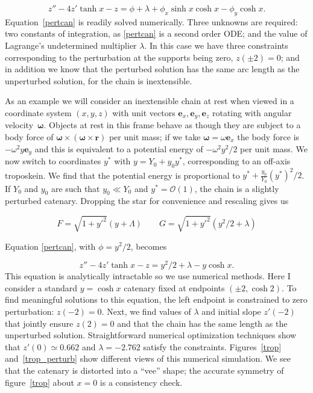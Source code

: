 \documentclass[pdflatex,sn-mathphys-num]{sn-jnl}%
\theoremstyle{thmstyleone}%
\theoremstyle{thmstyletwo}%
\theoremstyle{thmstylethree}%
\begin{document}
\begin{equation}\label{pertcan}
  z'' - 4z'\tanh x - z =
  \phi + \lambda + \phi_x\sinh x\cosh x - \phi_y\cosh x.
\end{equation}
%
Equation~\ref{pertcan} is readily solved numerically.  Three unknowns
are required: two constants of integration, as \ref{pertcan} is a
second order ODE; and the value of Lagrange's undetermined multiplier
$\lambda$.  In this case we have three constraints corresponding to
the perturbation at the supports being zero, $z(\pm 2)=0$; and in
addition we know that the perturbed solution has the same arc length
as the unperturbed solution, for the chain is inextensible.

As an example we will consider an inextensible chain at rest when
viewed in a coordinate system $(x,y,z)$ with unit vectors
$\boldsymbol{e}_x,\boldsymbol{e}_y,\boldsymbol{e}_z$ rotating with
angular velocity~$\boldsymbol{\omega}$.  Objects at rest in this frame
behave as though they are subject to a body force of
$\boldsymbol{\omega}\times\left(\boldsymbol{\omega}\times\boldsymbol{r}\right)$
per unit mass; if we take $\boldsymbol{\omega}=\omega\boldsymbol{e}_x$
the body force is $-\omega^2y\boldsymbol{e}_y$ and this is equivalent
to a potential energy of $-\omega^2y^2/2$ per unit mass.  We now
switch to coordinates $y^*$ with $y = Y_0 + y_0y^*$, corresponding to
an off-axis troposkein.  We find that the potential energy is
proportional to $y^*+\frac{y_0}{Y_0}\left(y^*\right)^2/2$.  If $Y_0$
and $y_0$ are such that $y_0\ll Y_0$ and $y^*={\mathcal O}(1)$, the
chain is a slightly perturbed catenary.  Dropping the star for
convenience and rescaling gives us

\begin{equation}
  F = \sqrt{1+y'^2}(y+\Lambda)\qquad
  G = \sqrt{1+y'^2}(y^2/2 + \lambda)
\end{equation}

Equation \ref{pertcan}, with $\phi=y^2/2$, becomes

\begin{equation}
  z'' - 4z'\tanh x - z = y^2/2 + \lambda -y\cosh x.
\end{equation}
%
This equation is analytically intractable so we use numerical methods.
Here I consider a standard $y=\cosh x$ catenary fixed at endpoints
$(\pm 2, \cosh 2)$.  To find meaningful solutions to this equation,
the left endpoint is constrained to zero perturbation: $z(-2)=0$.
Next, we find values of $\lambda$ and initial slope $z'(-2)$ that
jointly ensure $z(2)=0$ and that the chain has the same length as the
unperturbed solution.  Straightforward numerical optimization
techniques show that $z'(0)\simeq 0.662$ and $\lambda = -2.762$
satisfy the constraints.  Figures~\ref{trop} and~\ref{trop_perturb}
show different views of this numerical simulation.  We see that the
catenary is distorted into a ``vee'' shape; the accurate symmetry of
figure~\ref{trop} about $x=0$ is a consistency check.
\end{document}
